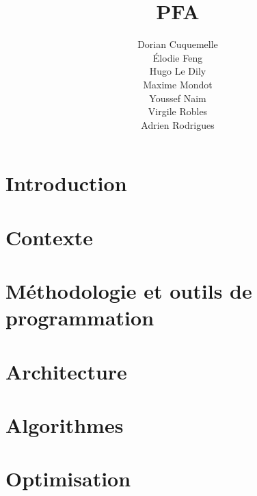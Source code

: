 \documentclass{style}
\title{PFA}
\author{
    Dorian Cuquemelle\\ 
    Élodie Feng\\
    Hugo Le Dily \\
    Maxime Mondot\\
    Youssef Naim\\
    Virgile Robles\\
    Adrien Rodrigues
}
\begin{document}
\justifying
\maketitle
\newpage

\tableofcontents
\newpage

\section*{Introduction}


\section{Contexte}


\section{Méthodologie et outils de programmation}


\section{Architecture}



\section{Algorithmes}


\section{Optimisation}

\end{document}
